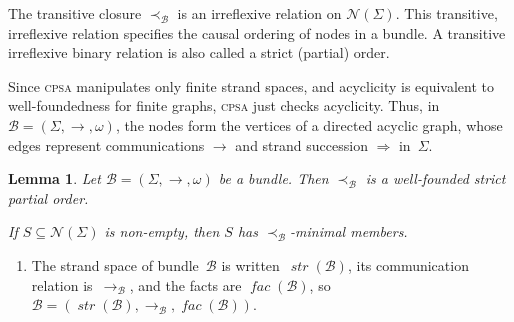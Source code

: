 \documentclass[12pt]{article}
\newcommand{\cpsa}{\textsc{cpsa}}
\newcommand{\fn}[1]{\ensuremath{\operatorname{\mathit{#1}}}}
\newcommand{\nodes}{\ensuremath{\mathcal{N}}}
\newcommand{\bun}{\ensuremath{\mathcal{B}}}
\newcommand{\ssp}{\Sigma}
\newcommand{\str}{\fn{str}}
\newcommand{\fac}{\fn{fac}}
\newcounter{running}[section]
\newenvironment{renumerate}{\begin{enumerate}%
\setcounter{enumi}{\value{running}}}%
{\setcounter{running}{\value{enumi}}\end{enumerate}}
\newtheorem{lemma}{Lemma}
\begin{document}
%
The transitive closure $\prec_{\bun}$ is an irreflexive relation on
$\nodes(\ssp)$.  This transitive, irreflexive relation specifies the
causal ordering of nodes in a bundle.  A transitive irreflexive binary
relation is also called a strict (partial) order.

Since {\cpsa} manipulates only finite strand spaces, and acyclicity is
equivalent to well-foundedness for finite graphs, {\cpsa} just checks
acyclicity.  Thus, in $\bun=(\ssp,\to,\omega)$, the nodes form the vertices
of a directed acyclic graph, whose edges represent communications
$\rightarrow$ and strand succession $\Rightarrow$ in~$\ssp$.
%
\begin{lemma}
  Let $\bun=(\ssp,\to,\omega)$ be a bundle.  Then $\prec_{\bun}$ is a
  well-founded strict partial order.

  If $S\subseteq\nodes(\ssp)$ is non-empty, then $S$ has
  $\prec_{\bun}$-minimal members.
\end{lemma}

\begin{renumerate}
  \item The strand space of bundle~{\bun} is written~$\str(\bun)$, its
    communication relation is~$\to_\bun$, and the facts are
    $\fac(\bun)$, so $\bun=(\str(\bun),\to_\bun,\fac(\bun))$.
\end{renumerate}
%
\end{document}
